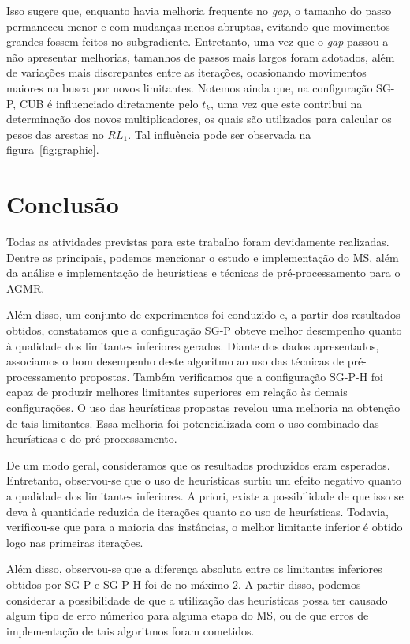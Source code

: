 \documentclass[12pt, a4paper]{article}
\theoremstyle{plain}
\theoremstyle{definition}
\theoremstyle{remark}
\begin{document}
Isso sugere que, enquanto havia melhoria frequente no \textit{gap}, o tamanho do passo permaneceu menor e com mudanças menos abruptas, evitando que movimentos grandes fossem feitos no subgradiente. Entretanto, uma vez que o \textit{gap} passou a não apresentar melhorias, tamanhos de passos mais largos foram adotados, além de variações mais discrepantes entre as iterações, ocasionando movimentos maiores na busca por novos limitantes. Notemos ainda que, na configuração SG-P, CUB é influenciado diretamente pelo $t_k$, uma vez que este contribui na determinação dos novos multiplicadores, os quais são utilizados para calcular os pesos das arestas no $RL_1$. Tal influência pode ser observada na figura~\ref{fig:graphic}.

\section{Conclusão}

Todas as atividades previstas para este trabalho foram devidamente realizadas. Dentre as principais, podemos mencionar o estudo e implementação do MS, além da análise e implementação de heurísticas e técnicas de pré-processamento para o AGMR.

Além disso, um conjunto de experimentos foi conduzido e, a partir dos resultados obtidos, constatamos que a configuração SG-P obteve melhor desempenho quanto à qualidade dos limitantes inferiores gerados. Diante dos dados apresentados, associamos o bom desempenho deste algoritmo ao uso das técnicas de pré-processamento propostas. Também verificamos que a configuração SG-P-H foi capaz de produzir melhores limitantes superiores em relação às demais configurações. O uso das heurísticas propostas revelou uma melhoria na obtenção de tais limitantes. Essa melhoria foi potencializada com o uso combinado das heurísticas e do pré-processamento.

De um modo geral, consideramos que os resultados produzidos eram esperados. Entretanto, observou-se que o uso de heurísticas surtiu um efeito negativo quanto a qualidade dos limitantes inferiores. A priori, existe a possibilidade de que isso se deva à quantidade reduzida de iterações quanto ao uso de heurísticas. Todavia, verificou-se que para a maioria das instâncias, o melhor limitante inferior é obtido logo nas primeiras iterações.

Além disso, observou-se que a diferença absoluta entre os limitantes inferiores obtidos por SG-P e SG-P-H foi de no máximo $2$. A partir disso, podemos considerar a possibilidade de que a utilização das heurísticas possa ter causado algum tipo de erro númerico para alguma etapa do MS, ou de que erros de implementação de tais algoritmos foram cometidos.
\end{document}
